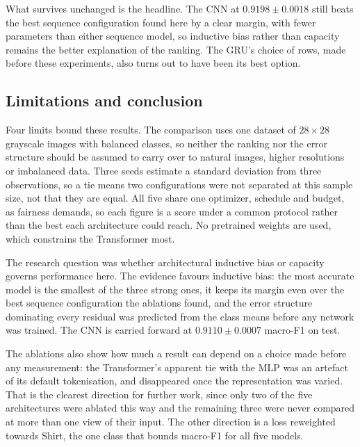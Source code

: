 What survives unchanged is the headline. The CNN at $0.9198 \pm 0.0018$ still beats the best
sequence configuration found here by a clear margin, with fewer parameters than either sequence
model, so inductive bias rather than capacity remains the better explanation of the ranking. The
GRU's choice of rows, made before these experiments, also turns out to have been its best
option.

\subsection{Limitations and conclusion}
\label{subsec:results-7}

Four limits bound these results. The comparison uses one dataset of $28 \times 28$ grayscale
images with balanced classes, so neither the ranking nor the error structure should be assumed to
carry over to natural images, higher resolutions or imbalanced data. Three seeds estimate a
standard deviation from three observations, so a tie means two configurations were not separated
at this sample size, not that they are equal. All five share one optimizer, schedule and budget,
as fairness demands, so each figure is a score under a common protocol rather than the best each
architecture could reach. No pretrained weights are used, which constrains the Transformer
most.

The research question was whether architectural inductive bias or capacity governs performance
here. The evidence favours inductive bias: the most accurate model is the smallest of the three
strong ones, it keeps its margin even over the best sequence configuration the ablations found,
and the error structure dominating every residual was predicted from the class means before any
network was trained. The CNN is carried forward at $0.9110 \pm 0.0007$ macro-F1 on test.

The ablations also show how much a result can depend on a choice made before any measurement:
the Transformer's apparent tie with the MLP was an artefact of its default tokenisation, and
disappeared once the representation was varied. That is the clearest direction for further work,
since only two of the five architectures were ablated this way and the remaining three were never
compared at more than one view of their input. The other direction is a loss reweighted towards
Shirt, the one class that bounds macro-F1 for all five models.
